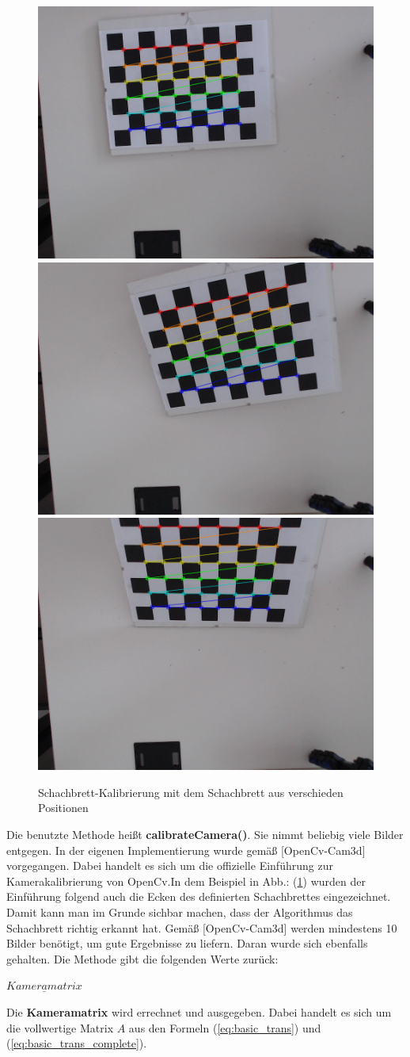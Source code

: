		\begin{figure}[h]
			\centering
			\includegraphics[width=0.32\linewidth]{img/hauptteil/calibration/chessboard_corner_0.png}
			\includegraphics[width=0.32\linewidth]{img/hauptteil/calibration/chessboard_corner_1.png}
			\includegraphics[width=0.32\linewidth]{img/hauptteil/calibration/chessboard_corner_2.png}
			\caption[Schachbrett-Kalibrierung]{Schachbrett-Kalibrierung mit dem Schachbrett aus verschieden Positionen}
			\label{fig:chessboards}
		\end{figure}
	
		Die benutzte Methode heißt \textbf{calibrateCamera()}. Sie nimmt beliebig viele Bilder entgegen. In der eigenen Implementierung wurde gemäß [OpenCv-Cam3d] vorgegangen. Dabei handelt es sich um die offizielle Einführung zur Kamerakalibrierung von OpenCv.In dem Beispiel in Abb.: (\ref{fig:chessboards}) wurden der Einführung folgend auch die Ecken des definierten Schachbrettes eingezeichnet. Damit kann man im Grunde sichbar machen, dass der Algorithmus das Schachbrett richtig erkannt hat. Gemäß [OpenCv-Cam3d] werden mindestens 10 Bilder benötigt, um gute Ergebnisse zu liefern. Daran wurde sich ebenfalls gehalten. Die Methode gibt die folgenden Werte zurück:
		
		$\underline{Kameramatrix}$
		
		Die \textbf{Kameramatrix} wird errechnet und ausgegeben. Dabei handelt es sich um die vollwertige Matrix \( A \) aus den Formeln (\ref{eq:basic_trans}) und (\ref{eq:basic_trans_complete}).
		
